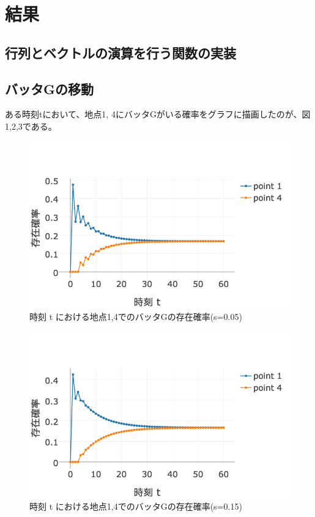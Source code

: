\documentclass[11pt]{ltjsarticle}
\begin{document}
\section{結果}
\subsection{行列とベクトルの演算を行う関数の実装}

\subsection{バッタGの移動}
ある時刻tにおいて、地点1, 4にバッタGがいる確率をグラフに描画したのが、図1,2,3である。

\begin{figure}
  \includegraphics[width=\textwidth]{fig1.png}
  \caption{時刻 t における地点1,4でのバッタGの存在確率(s=0.05)}
\end{figure}

\begin{figure}
  \includegraphics[width=\textwidth]{fig2.png}
  \caption{時刻 t における地点1,4でのバッタGの存在確率(s=0.15)}
\end{figure}
\end{document}
